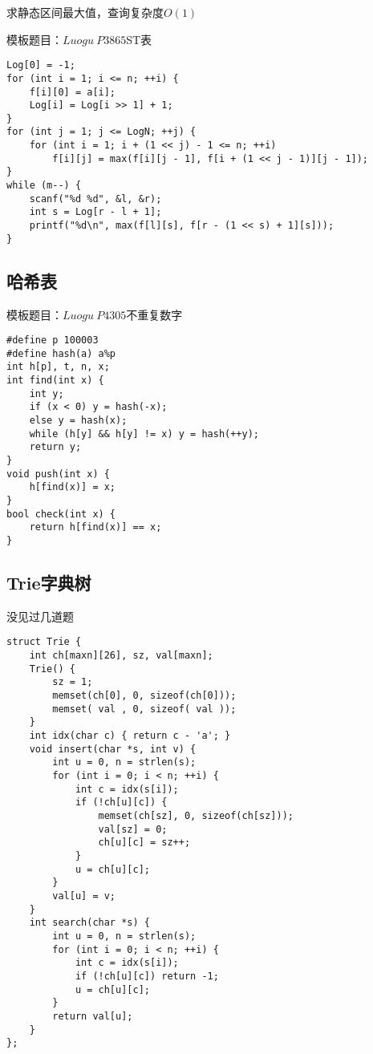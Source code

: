 \documentclass[UTF8]{ctexart}
\begin{document}
求静态区间最大值，查询复杂度$O(1)$

模板题目：$Luogu\ P3865$ST表

\begin{lstlisting}
Log[0] = -1;
for (int i = 1; i <= n; ++i) {
    f[i][0] = a[i];
    Log[i] = Log[i >> 1] + 1;
}
for (int j = 1; j <= LogN; ++j) {
    for (int i = 1; i + (1 << j) - 1 <= n; ++i)
        f[i][j] = max(f[i][j - 1], f[i + (1 << j - 1)][j - 1]);
}
while (m--) {
    scanf("%d %d", &l, &r);
    int s = Log[r - l + 1];
    printf("%d\n", max(f[l][s], f[r - (1 << s) + 1][s]));
}
\end{lstlisting}

\subsection{哈希表}

模板题目：$Luogu\ P4305$不重复数字

\begin{lstlisting}
#define p 100003
#define hash(a) a%p
int h[p], t, n, x;
int find(int x) {
    int y;
    if (x < 0) y = hash(-x);
    else y = hash(x);
    while (h[y] && h[y] != x) y = hash(++y);
    return y;
}
void push(int x) {
    h[find(x)] = x;
}
bool check(int x) {
    return h[find(x)] == x;
}
\end{lstlisting}

\subsection{Trie字典树}

没见过几道题

\begin{lstlisting}
struct Trie {
    int ch[maxn][26], sz, val[maxn];
    Trie() {
        sz = 1;
        memset(ch[0], 0, sizeof(ch[0]));
        memset( val , 0, sizeof( val ));
    }
    int idx(char c) { return c - 'a'; }
    void insert(char *s, int v) {
        int u = 0, n = strlen(s);
        for (int i = 0; i < n; ++i) {
            int c = idx(s[i]);
            if (!ch[u][c]) {
                memset(ch[sz], 0, sizeof(ch[sz]));
                val[sz] = 0;
                ch[u][c] = sz++;
            }
            u = ch[u][c];
        }
        val[u] = v;
    }
    int search(char *s) {
        int u = 0, n = strlen(s);
        for (int i = 0; i < n; ++i) {
            int c = idx(s[i]);
            if (!ch[u][c]) return -1;
            u = ch[u][c];
        }
        return val[u];
    }
};
\end{lstlisting}
\end{document}
